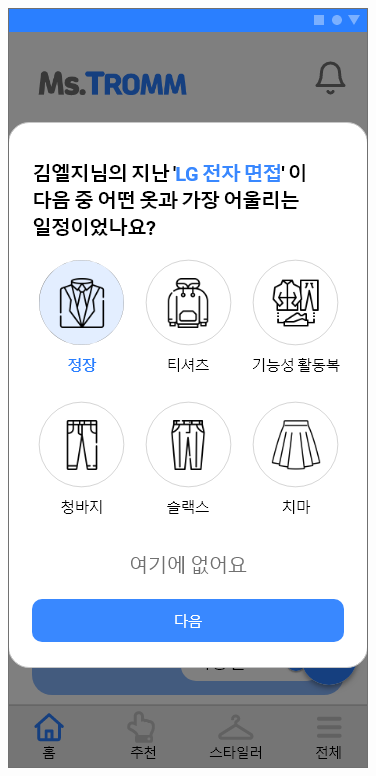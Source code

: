 \documentclass[conference]{IEEEtran}
\begin{document}
\begin{enumerate}
\begin{itemize}
        \centerline{\includegraphics[scale=0.24]{assets/학습 팝업2.png}
}
\end{itemize}
\end{enumerate}
\end{document}

